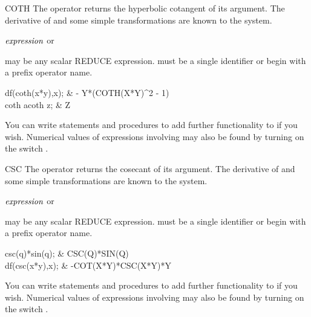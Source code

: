 \begin{Operator}[coth]{COTH}
The  operator returns the hyperbolic cotangent of its argument.
The derivative of  and some simple transformations are known
to the system.

\begin{Syntax}
\(\meta{expression}\) or  
\end{Syntax}

 may be any scalar REDUCE expression.  
must be a single identifier or begin with a prefix operator name.

\begin{Examples}
df(coth(x*y),x);             &      - Y*(COTH(X*Y)^{2}  - 1) \\

coth acoth z;                &      Z
\end{Examples}

\begin{Comments}
You can write  statements and procedures to add further
functionality to  if you wish.  Numerical values of expressions
involving  may also be found by turning on the switch
.

\end{Comments}
\end{Operator}

\begin{Operator}[csc]{CSC}
The  operator returns the cosecant of its argument.
The derivative of  and some simple transformations are known
to the system.

\begin{Syntax}
\(\meta{expression}\) or  
\end{Syntax}

 may be any scalar REDUCE expression.  
must be a single identifier or begin with a prefix operator name.

\begin{Examples}

csc(q)*sin(q);               &       CSC(Q)*SIN(Q) \\

df(csc(x*y),x);              &       -COT(X*Y)*CSC(X*Y)*Y
\end{Examples}

\begin{Comments}
You can write  statements and procedures to add further
functionality to  if you wish.  Numerical values of expressions
involving  may also be found by turning on the switch
.

\end{Comments}
\end{Operator}


